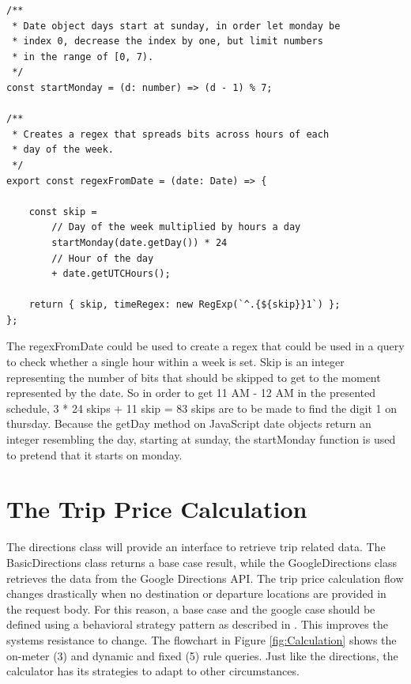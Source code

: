 \begin{lstlisting}[caption={Opening timeframe.}, label={lst:open-timeframe}]
/**
 * Date object days start at sunday, in order let monday be
 * index 0, decrease the index by one, but limit numbers
 * in the range of [0, 7).
 */
const startMonday = (d: number) => (d - 1) % 7;

/**
 * Creates a regex that spreads bits across hours of each
 * day of the week.
 */
export const regexFromDate = (date: Date) => {

	const skip =
		// Day of the week multiplied by hours a day
		startMonday(date.getDay()) * 24
		// Hour of the day
		+ date.getUTCHours();

	return { skip, timeRegex: new RegExp(`^.{${skip}}1`) };
};
\end{lstlisting}

The regexFromDate could be used to create a regex that could be used in a query to check whether a single hour within a week is set. Skip is an integer representing the number of bits that should be skipped to get to the moment represented by the date. So in order to get 11 AM - 12 AM in the presented schedule, 3 * 24 skips + 11 skip = 83 skips are to be made to find the digit 1 on thursday. Because the getDay method on JavaScript date objects return an integer resembling the day, starting at sunday, the startMonday function is used to pretend that it starts on monday.

%
\section{The Trip Price Calculation}
The directions class will provide an interface to retrieve trip related data. The BasicDirections class returns a base case result, while the GoogleDirections class retrieves the data from the Google Directions API. The trip price calculation flow changes drastically when no destination or departure locations are provided in the request body. For this reason, a base case and the google case should be defined using a behavioral strategy pattern as described in \cite{gof}. This improves the systems resistance to change. The flowchart in Figure \ref{fig:Calculation} shows the on-meter (3) and dynamic and fixed (5) rule queries. Just like the directions, the calculator has its strategies to adapt to other circumstances.

